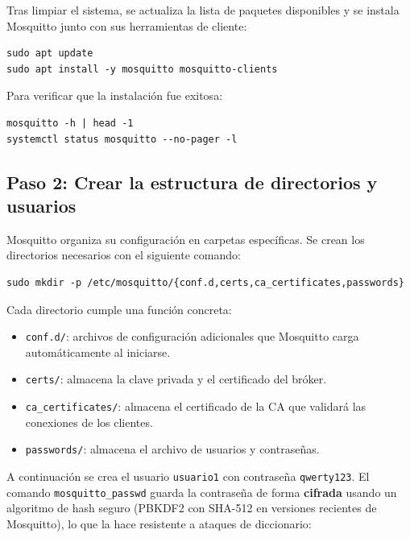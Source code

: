 \documentclass[12pt,a4paper]{article}
\begin{document}
Tras limpiar el sistema, se actualiza la lista de paquetes disponibles y se
instala Mosquitto junto con sus herramientas de cliente:

\begin{lstlisting}[style=bash]
sudo apt update
sudo apt install -y mosquitto mosquitto-clients
\end{lstlisting}

Para verificar que la instalación fue exitosa:

\begin{lstlisting}[style=bash]
mosquitto -h | head -1
systemctl status mosquitto --no-pager -l
\end{lstlisting}

\subsection{Paso 2: Crear la estructura de directorios y usuarios}

Mosquitto organiza su configuración en carpetas específicas. Se crean los
directorios necesarios con el siguiente comando:

\begin{lstlisting}[style=bash]
sudo mkdir -p /etc/mosquitto/{conf.d,certs,ca_certificates,passwords}
\end{lstlisting}

Cada directorio cumple una función concreta:

\begin{itemize}
  \item \texttt{conf.d/}: archivos de configuración adicionales que Mosquitto
    carga automáticamente al iniciarse.
  \item \texttt{certs/}: almacena la clave privada y el certificado del bróker.
  \item \texttt{ca\_certificates/}: almacena el certificado de la CA
    que validará las conexiones de los clientes.
  \item \texttt{passwords/}: almacena el archivo de usuarios y contraseñas.
\end{itemize}

A continuación se crea el usuario \texttt{usuario1} con contraseña
\texttt{qwerty123}. El comando \texttt{mosquitto\_passwd} guarda la contraseña
de forma \textbf{cifrada} usando un algoritmo de hash seguro (PBKDF2 con
SHA-512 en versiones recientes de Mosquitto), lo que la hace resistente a
ataques de diccionario:
\end{document}
